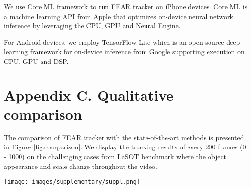 \documentclass[runningheads]{llncs}
\begin{document}
We use Core ML \cite{coreml} framework to run FEAR tracker on iPhone devices. Core ML is a machine learning API from Apple that optimizes on-device neural network inference by leveraging the CPU, GPU and Neural Engine. 

For Android devices, we employ TensorFlow Lite \cite{tensorflow2015-whitepaper} which is an open-source deep learning framework for on-device inference from Google supporting execution on CPU, GPU and DSP.

\section*{Appendix C. Qualitative comparison}
The comparison of FEAR tracker with the state-of-the-art methods is presented in Figure \ref{fig:comparison}. We display the tracking results of every 200 frames (0 - 1000) on the challenging cases from LaSOT benchmark where the object appearance and scale change throughout the video. 

\begin{figure*}[htp!]\centering
  \texttt{[image: images/supplementary/suppl.png]} \\
   \caption{Qualitative comparison of FEAR tracker with state-of-the-art methods on challenging cases of variations in tracked object appearance from LaSOT benchmark \cite{LaSOT}. \textcolor{green}{Green}: Ground Truth, \textcolor{red}{Red}: FEAR-L, \textcolor{yellow}{Yellow}: STARK Lightning, \textcolor{blue}{Blue}: Ocean, \textcolor{purple}{Purple}: Stark-ST50.}
   \label{fig:comparison}
\end{figure*}
\end{document}
